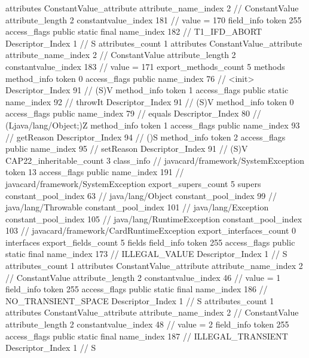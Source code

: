 {{{{{				attributes {
				ConstantValue_attribute {
					attribute_name_index	2		// ConstantValue
					attribute_length	2
					constantvalue_index	181		// value = 170
				}
				}
			}
			field_info {
				token	255
				access_flags	public static final
				name_index	182		// T1_IFD_ABORT
				Descriptor_Index	1		// S
				attributes_count	1
				attributes {
				ConstantValue_attribute {
					attribute_name_index	2		// ConstantValue
					attribute_length	2
					constantvalue_index	183		// value = 171
				}
				}
			}
			}
			export_methods_count	5
			methods {
				method_info {
					token	0
					access_flags	public
					name_index	76		// <init>
					Descriptor_Index	91		// (S)V
				}
				method_info {
					token	1
					access_flags	public static
					name_index	92		// throwIt
					Descriptor_Index	91		// (S)V
				}
				method_info {
					token	0
					access_flags	public
					name_index	79		// equals
					Descriptor_Index	80		// (Ljava/lang/Object;)Z
				}
				method_info {
					token	1
					access_flags	public
					name_index	93		// getReason
					Descriptor_Index	94		// ()S
				}
				method_info {
					token	2
					access_flags	public
					name_index	95		// setReason
					Descriptor_Index	91		// (S)V
				}
			}
			CAP22_inheritable_count	3
		}
		class_info {		// javacard/framework/SystemException
			token	13
			access_flags	public
			name_index	191		// javacard/framework/SystemException
			export_supers_count	5
			supers {
				constant_pool_index	63		// java/lang/Object
				constant_pool_index	99		// java/lang/Throwable
				constant_pool_index	101		// java/lang/Exception
				constant_pool_index	105		// java/lang/RuntimeException
				constant_pool_index	103		// javacard/framework/CardRuntimeException
			}
			export_interfaces_count	0
			interfaces {
			}
			export_fields_count	5
			fields {
			field_info {
				token	255
				access_flags	public static final
				name_index	173		// ILLEGAL_VALUE
				Descriptor_Index	1		// S
				attributes_count	1
				attributes {
				ConstantValue_attribute {
					attribute_name_index	2		// ConstantValue
					attribute_length	2
					constantvalue_index	46		// value = 1
				}
				}
			}
			field_info {
				token	255
				access_flags	public static final
				name_index	186		// NO_TRANSIENT_SPACE
				Descriptor_Index	1		// S
				attributes_count	1
				attributes {
				ConstantValue_attribute {
					attribute_name_index	2		// ConstantValue
					attribute_length	2
					constantvalue_index	48		// value = 2
				}
				}
			}
			field_info {
				token	255
				access_flags	public static final
				name_index	187		// ILLEGAL_TRANSIENT
				Descriptor_Index	1		// S
}}}}}
